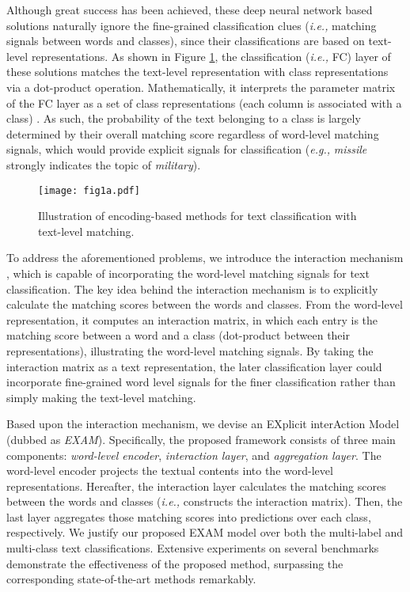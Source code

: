 \documentclass[letterpaper]{article} \usepackage{aaai19}  \usepackage{times}  \usepackage{helvet}  \usepackage{courier}  \usepackage{url}  \usepackage{graphicx}
\newcommand{\ie}{\emph{i.e., }}
\newcommand{\eg}{\emph{e.g., }}
\begin{document}
Although great success has been achieved, these deep neural network based solutions naturally ignore the fine-grained classification clues (\ie matching signals between words and classes), since their classifications are based on text-level representations. As shown in Figure \ref{dense_intro}, the classification (\ie FC) layer of these solutions matches the text-level representation with class representations via a dot-product operation. Mathematically, it interprets the parameter matrix of the FC layer as a set of class representations (each column is associated with a class) \cite{output}. As such, the probability of the text belonging to a class is largely determined by their overall matching score regardless of word-level matching signals, which would provide explicit signals for classification (\eg \textit{missile} strongly indicates the topic of \textit{military}).

\begin{figure}[htbp] \centering    
	\texttt{[image: fig1a.pdf]} 
	\caption{Illustration of encoding-based methods for text classification with text-level matching.}     
	\label{dense_intro}
\end{figure}

To address the aforementioned problems, we introduce the interaction mechanism \cite{llstm}, which is capable of incorporating the word-level matching signals for text classification. The key idea behind the interaction mechanism is to explicitly calculate the matching scores between the words and classes. From the word-level representation, it computes an interaction matrix, in which each entry is the matching score between a word and a class (dot-product between their representations), illustrating the word-level matching signals. By taking the interaction matrix as a text representation, the later classification layer could  incorporate fine-grained word level signals for the finer classification rather than simply making the text-level matching.

Based upon the interaction mechanism, we devise an EXplicit interAction Model (dubbed as \textit{EXAM}). Specifically, the proposed framework consists of three main components: \textit{word-level encoder}, \textit{interaction layer}, and \textit{aggregation layer}. The word-level encoder projects the textual contents into the word-level representations. Hereafter, the interaction layer calculates the matching scores between the words and classes (\ie constructs the interaction matrix). Then, the last layer aggregates those matching scores into predictions over each class, respectively. We justify our proposed EXAM model over both the multi-label and multi-class text classifications. Extensive experiments on several benchmarks demonstrate the effectiveness of the proposed method, surpassing the corresponding state-of-the-art methods remarkably. 
\end{document}
